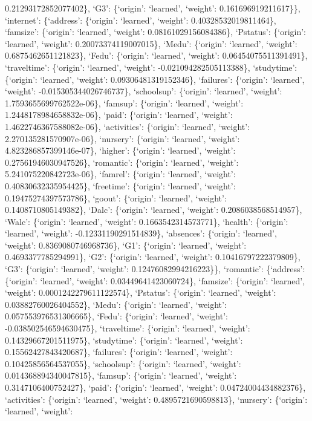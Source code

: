 \documentclass[
]{article}
\begin{document}
0.21293172852077402\}, `G3': \{`origin': `learned', `weight':
0.161696919211617\}\}, `internet': \{`address': \{`origin': `learned',
`weight': 0.40328532019811464\}, `famsize': \{`origin': `learned',
`weight': 0.08161029156084386\}, `Pstatus': \{`origin': `learned',
`weight': 0.20073374119007015\}, `Medu': \{`origin': `learned',
`weight': 0.6875462651121823\}, `Fedu': \{`origin': `learned', `weight':
0.06454075511391491\}, `traveltime': \{`origin': `learned', `weight':
-0.021094282505113388\}, `studytime': \{`origin': `learned', `weight':
0.09306481319152346\}, `failures': \{`origin': `learned', `weight':
-0.015305344026746737\}, `schoolsup': \{`origin': `learned', `weight':
1.7593655699762522e-06\}, `famsup': \{`origin': `learned', `weight':
1.2448178984658832e-06\}, `paid': \{`origin': `learned', `weight':
1.4622746367588082e-06\}, `activities': \{`origin': `learned', `weight':
2.270135281570907e-06\}, `nursery': \{`origin': `learned', `weight':
4.823286857399146e-07\}, `higher': \{`origin': `learned', `weight':
0.27561946030947526\}, `romantic': \{`origin': `learned', `weight':
5.241075220842723e-06\}, `famrel': \{`origin': `learned', `weight':
0.40830632335954425\}, `freetime': \{`origin': `learned', `weight':
0.19475274397573786\}, `goout': \{`origin': `learned', `weight':
0.1408710805149382\}, `Dalc': \{`origin': `learned', `weight':
0.2086038568514957\}, `Walc': \{`origin': `learned', `weight':
0.1663542314573771\}, `health': \{`origin': `learned', `weight':
-0.12331190291514839\}, `absences': \{`origin': `learned', `weight':
0.8369080746968736\}, `G1': \{`origin': `learned', `weight':
0.4693377785294991\}, `G2': \{`origin': `learned', `weight':
0.10416797222379809\}, `G3': \{`origin': `learned', `weight':
0.12476082994216223\}\}, `romantic': \{`address': \{`origin': `learned',
`weight': 0.03449641423060724\}, `famsize': \{`origin': `learned',
`weight': 0.0001242279611122574\}, `Pstatus': \{`origin': `learned',
`weight': 0.03882760026404552\}, `Medu': \{`origin': `learned',
`weight': 0.057553976531306665\}, `Fedu': \{`origin': `learned',
`weight': -0.038502546594630475\}, `traveltime': \{`origin': `learned',
`weight': 0.14329667201511975\}, `studytime': \{`origin': `learned',
`weight': 0.15562427843420687\}, `failures': \{`origin': `learned',
`weight': 0.10425856564537055\}, `schoolsup': \{`origin': `learned',
`weight': 0.014368894340047815\}, `famsup': \{`origin': `learned',
`weight': 0.3147106400752427\}, `paid': \{`origin': `learned', `weight':
0.04724004434882376\}, `activities': \{`origin': `learned', `weight':
0.4895721690598813\}, `nursery': \{`origin': `learned', `weight':
\end{document}
